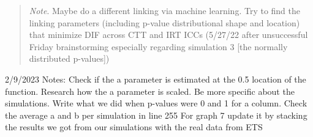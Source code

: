 \documentclass[
  man]{apa6}
\begin{document}
\begin{quote}
\emph{Note}. Maybe do a different linking via machine learning. Try to find the linking parameters (including p-value distributional shape and location) that minimize DIF across CTT and IRT ICCs (5/27/22 after unsuccessful Friday brainstorming especially regarding simulation 3 {[}the normally distributed p-values{]})
\end{quote}

2/9/2023 Notes: Check if the a parameter is estimated at the 0.5 location of the function. Research how the a parameter is scaled.
Be more specific about the simulations. Write what we did when p-values were 0 and 1 for a column.
Check the average a and b per simulation in line 255
For graph 7 update it by stacking the results we got from our simulations with the real data from ETS
\end{document}
